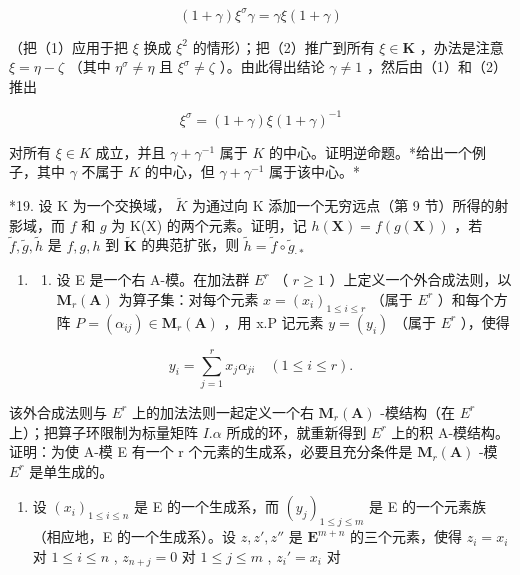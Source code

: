 \[
(1 + \gamma) \xi^ {\sigma} \gamma = \gamma \xi (1 + \gamma)\tag{2}
\]

（把（1）应用于把 \(\xi\) 换成 \(\xi^2\) 的情形）；把（2）推广到所有 \(\xi \in \mathbf{K}\) ，办法是注意 \(\xi = \eta - \zeta\) （其中 \(\eta^\sigma \neq \eta\) 且 \(\xi^\sigma \neq \zeta\) ）。由此得出结论 \(\gamma \neq 1\) ，然后由（1）和（2）推出

\[
\xi^ {\sigma} = (1 + \gamma) \xi (1 + \gamma) ^ {- 1}\tag{3}
\]

对所有 \(\xi \in K\) 成立，并且 \(\gamma + \gamma^{-1}\) 属于 \(K\) 的中心。证明逆命题。*给出一个例子，其中 \(\gamma\) 不属于 \(K\) 的中心，但 \(\gamma + \gamma^{-1}\) 属于该中心。*

*19. 设 K 为一个交换域， \(\tilde{K}\) 为通过向 K 添加一个无穷远点（第 9 节）所得的射影域，而 \(f\) 和 \(g\) 为 K(X) 的两个元素。证明，记 \(h(\mathbf{X}) = f(g(\mathbf{X}))\) ，若 \(\tilde{f}, \tilde{g}, \tilde{h}\) 是 \(f, g, h\) 到 \(\tilde{\mathbf{K}}\) 的典范扩张，则 \(\tilde{h} = \tilde{f} \circ \tilde{g}_{\cdot *}\)

\BourbakiExercisesSection

\begin{enumerate}
\def\labelenumi{\arabic{enumi}.}
\tightlist
\item
  \begin{enumerate}
  \def\labelenumii{(\alph{enumii})}
  \tightlist
  \item
    设 E 是一个右 A-模。在加法群 \(E^{r}\) （ \(r \geqslant 1\) ）上定义一个外合成法则，以 \(\mathbf{M}_{r}(\mathbf{A})\) 为算子集：对每个元素 \(x = (x_{i})_{1 \leqslant i \leqslant r}\) （属于 \(E^{r}\) ）和每个方阵 \(P = (\alpha_{ij}) \in \mathbf{M}_{r}(\mathbf{A})\) ，用 x.P 记元素 \(y = (y_{i})\) （属于 \(E^{r}\) ），使得
  \end{enumerate}
\end{enumerate}

\[
y _ {i} = \sum_ {j = 1} ^ {r} x _ {j} \alpha_ {j i} \quad (1 \leqslant i \leqslant r).
\]

该外合成法则与 \(E^{r}\) 上的加法法则一起定义一个右 \(\mathbf{M}_{r}(\mathbf{A})\) -模结构（在 \(E^{r}\) 上）；把算子环限制为标量矩阵 \(I.\alpha\) 所成的环，就重新得到 \(E^{r}\) 上的积 A-模结构。证明：为使 A-模 E 有一个 r 个元素的生成系，必要且充分条件是 \(\mathbf{M}_{r}(\mathbf{A})\) -模 \(E^{r}\) 是单生成的。

\begin{enumerate}
\def\labelenumi{(\alph{enumi})}
\setcounter{enumi}{1}
\tightlist
\item
  设 \((x_{i})_{1\leqslant i\leqslant n}\) 是 E 的一个生成系，而 \((y_{j})_{1\leqslant j\leqslant m}\) 是 E 的一个元素族（相应地，E 的一个生成系）。设 \(z, z', z''\) 是 \(\mathbf{E}^{m + n}\) 的三个元素，使得 \(z_{i} = x_{i}\) 对 \(1\leqslant i\leqslant n\) , \(z_{n + j} = 0\) 对 \(1\leqslant j\leqslant m\) , \(z_{i}' = x_{i}\) 对
\end{enumerate}

